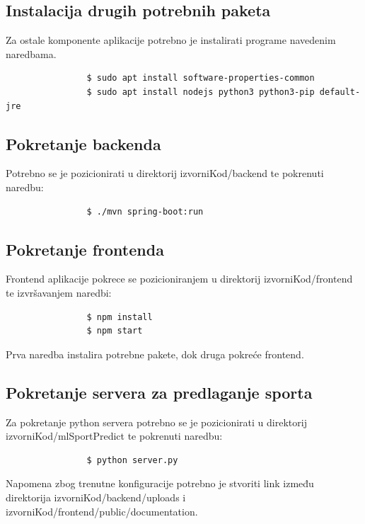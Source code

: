 			\subsection{Instalacija drugih potrebnih paketa}
			
			Za ostale komponente aplikacije potrebno je instalirati programe navedenim naredbama.
			
			\begin{verbatim}
				$ sudo apt install software-properties-common
				$ sudo apt install nodejs python3 python3-pip default-jre
			\end{verbatim}
		
			\subsection{Pokretanje backenda}
			Potrebno se je pozicionirati u direktorij izvorniKod/backend te pokrenuti naredbu:
			\begin{verbatim}
				$ ./mvn spring-boot:run
			\end{verbatim}
			
			\subsection{Pokretanje frontenda}
			Frontend aplikacije pokrece se pozicioniranjem u direktorij izvorniKod/frontend te izvršavanjem naredbi:
			
			\begin{verbatim}
				$ npm install
				$ npm start
			\end{verbatim}
			Prva naredba instalira potrebne pakete, dok druga pokreće frontend. 
			
			\subsection{Pokretanje servera za predlaganje sporta}

			Za pokretanje python servera potrebno se je pozicionirati u direktorij izvorniKod/mlSportPredict te pokrenuti naredbu:
			
			\begin{verbatim}
				$ python server.py
			\end{verbatim}
			
			
			Napomena zbog trenutne konfiguracije potrebno je stvoriti link između direktorija izvorniKod/backend/uploads i izvorniKod/frontend/public/documentation.
			
			\eject 
